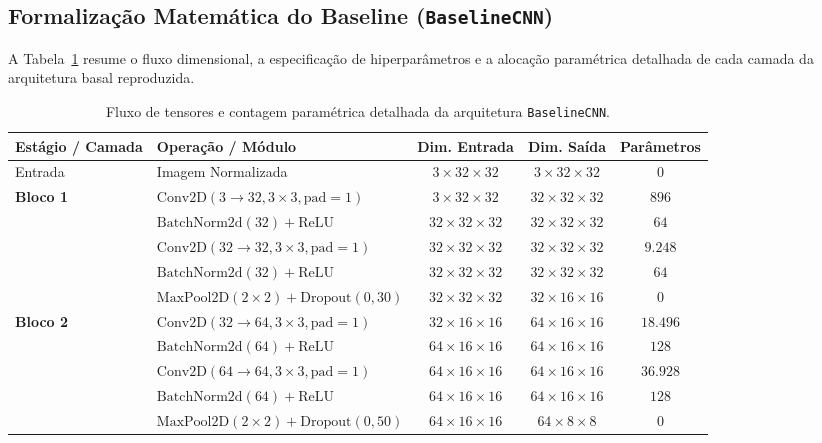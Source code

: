 \documentclass[runningheads]{llncs}
\begin{document}
\subsection{Formaliza\c{c}\~{a}o Matem\'{a}tica do Baseline (\texttt{BaselineCNN})}
A Tabela~\ref{tab:camadas_baseline} resume o fluxo dimensional, a especifica\c{c}\~{a}o de hiperpar\^{a}metros e a aloca\c{c}\~{a}o param\'{e}trica detalhada de cada camada da arquitetura basal reproduzida.

\begin{table}[H]
\centering
\caption{Fluxo de tensores e contagem param\'{e}trica detalhada da arquitetura \texttt{BaselineCNN}.}
\label{tab:camadas_baseline}
\setlength{\tabcolsep}{6pt}
\small
\begin{tabular}{llccc}
\toprule
\textbf{Est\'{a}gio / Camada} & \textbf{Opera\c{c}\~{a}o / M\'{o}dulo} & \textbf{Dim. Entrada} & \textbf{Dim. Sa\'{i}da} & \textbf{Par\^{a}metros} \\
\midrule
Entrada & Imagem Normalizada & $3 \times 32 \times 32$ & $3 \times 32 \times 32$ & $0$ \\
\midrule
\textbf{Bloco 1} & $\text{Conv2D}(3 \to 32, 3 \times 3, \text{pad}=1)$ & $3 \times 32 \times 32$ & $32 \times 32 \times 32$ & $896$ \\
& $\text{BatchNorm2d}(32) + \text{ReLU}$ & $32 \times 32 \times 32$ & $32 \times 32 \times 32$ & $64$ \\
& $\text{Conv2D}(32 \to 32, 3 \times 3, \text{pad}=1)$ & $32 \times 32 \times 32$ & $32 \times 32 \times 32$ & $9.248$ \\
& $\text{BatchNorm2d}(32) + \text{ReLU}$ & $32 \times 32 \times 32$ & $32 \times 32 \times 32$ & $64$ \\
& $\text{MaxPool2D}(2 \times 2) + \text{Dropout}(0{,}30)$ & $32 \times 32 \times 32$ & $32 \times 16 \times 16$ & $0$ \\
\midrule
\textbf{Bloco 2} & $\text{Conv2D}(32 \to 64, 3 \times 3, \text{pad}=1)$ & $32 \times 16 \times 16$ & $64 \times 16 \times 16$ & $18.496$ \\
& $\text{BatchNorm2d}(64) + \text{ReLU}$ & $64 \times 16 \times 16$ & $64 \times 16 \times 16$ & $128$ \\
& $\text{Conv2D}(64 \to 64, 3 \times 3, \text{pad}=1)$ & $64 \times 16 \times 16$ & $64 \times 16 \times 16$ & $36.928$ \\
& $\text{BatchNorm2d}(64) + \text{ReLU}$ & $64 \times 16 \times 16$ & $64 \times 16 \times 16$ & $128$ \\
& $\text{MaxPool2D}(2 \times 2) + \text{Dropout}(0{,}50)$ & $64 \times 16 \times 16$ & $64 \times 8 \times 8$ & $0$ \\

\end{tabular}
\end{table}
\end{document}
